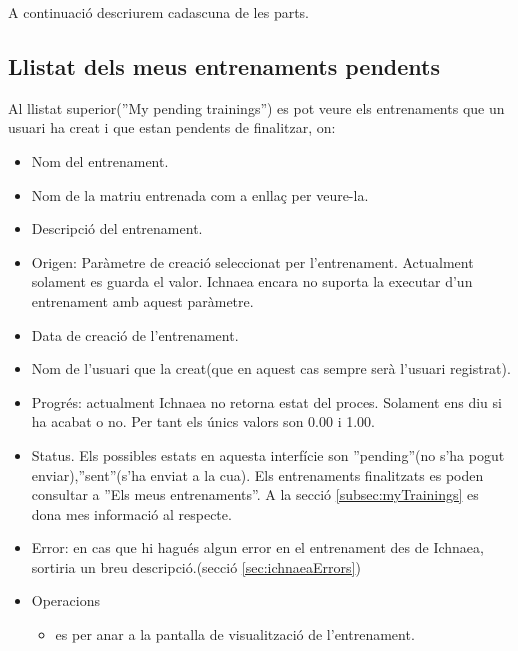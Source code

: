 A continuaci\'{o} descriurem cadascuna de les parts.

\subsection{Llistat dels meus entrenaments pendents}
Al llistat superior(''My pending trainings'') es pot veure els entrenaments que un usuari ha creat i que estan pendents de finalitzar, on: 
\begin{itemize}
\item Nom del entrenament.
\item Nom de la matriu entrenada com a enllaç per veure-la.
\item Descripci\'{o} del entrenament.
\item Origen: Paràmetre de creació seleccionat per l'entrenament. Actualment solament es guarda el valor. Ichnaea encara no suporta la executar d'un entrenament amb aquest paràmetre.
\item Data de creaci\'{o} de l'entrenament.
\item Nom de l'usuari que la creat(que en aquest cas sempre serà l'usuari registrat).
\item Progr\'{e}s: actualment Ichnaea no retorna estat del proces. Solament ens diu si ha acabat o no. Per tant els \'{u}nics valors son 0.00 i 1.00.
\item Status. Els possibles estats en aquesta interfície son ''pending''(no s'ha pogut enviar),''sent''(s'ha enviat a la cua). Els entrenaments finalitzats es poden consultar a ''Els meus entrenaments''. A la secció \ref{subsec:myTrainings} es dona mes informació al respecte.
\item Error: en cas que hi hagués algun error en el entrenament des de Ichnaea, sortiria un breu descripció.(secció  \ref{sec:ichnaeaErrors})
\item Operacions
 \begin{itemize}
 \item \iconeyeopen es per anar a la pantalla de visualització de l'entrenament.
 \end{itemize}
\end{itemize}

